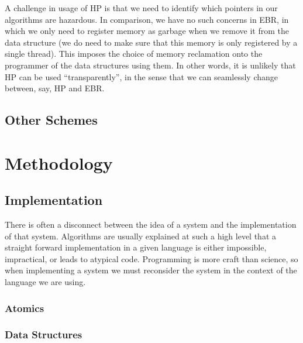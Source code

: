 \documentclass[a4paper,twoside]{report}
\begin{document}
A challenge in usage of HP is that we need to identify which pointers in our
algorithms are hazardous. In comparison, we have no such concerns in EBR, in
which we only need to register memory as garbage when we remove it from the data
structure (we do need to make sure that this memory is only registered by a
single thread).  This imposes the choice of memory reclamation onto the
programmer of the data structures using them. In other words, it is unlikely
that HP can be used ``transparently'', in the sense that we can seamlessly
change between, say, HP and EBR\@.


\section{Other Schemes}


\chapter{Methodology}

\section{Implementation}
There is often a disconnect between the idea of a system and the implementation
of that system.  Algorithms are usually explained at such a high level that a
straight forward implementation in a given language is either impossible,
impractical, or leads to atypical code.  Programming is more craft than
science, so when implementing a system we must reconsider the system in the
context of the language we are using.


\subsection{Atomics}

\subsection{Data Structures}
\end{document}
